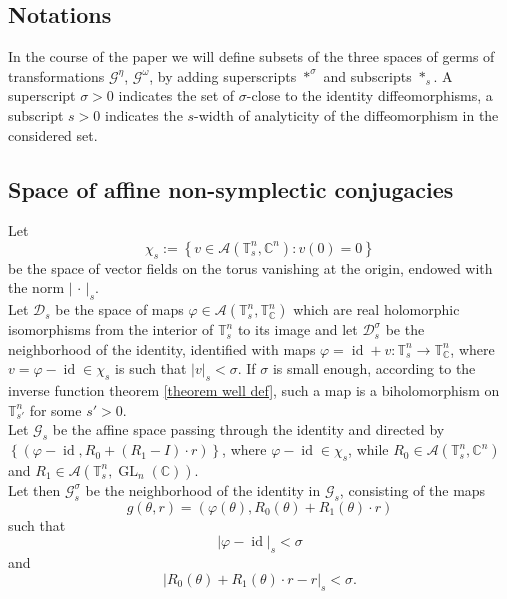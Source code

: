 \documentclass[oneside, 11pt]{amsbook}
\newcommand{\comment}[1]{}
\newcommand{\set}[1]{{\left\{#1\right\}}}
\newcommand{\pa}[1]{{\left(#1\right)}}
\newcommand{\abs}[1]{{\left|#1\right|}}
\newcommand{\G}{\mathcal{G}}
\newcommand{\A}{\mathcal{A}}
\newcommand{\T}{\mathbb{T}}
\newcommand{\C}{\mathbb{C}}
\newcommand{\teta}{\theta}
\newcommand{\GL}{\operatorname{GL}}
\newcommand{\pull}[1]{#1^\ast} %
\newcommand{\id}{\operatorname{id}}
\renewcommand{\S}{{\mathbb S}}
\newcommand{\0}{{(0)}}
\newcommand{\3}{{(3)}}
\numberwithin{equation}{section}
\numberwithin{defn}{section}
\numberwithin{prop}{section}
\numberwithin{cor}{section}
\numberwithin{lemma}{section}
\numberwithin{rmk}{section}
\numberwithin{corollary}{section}
\begin{document}
\subsection*{Notations} In the course of the paper we will define subsets of the three spaces of germs of transformations $\G^\eta$, $\G^{\omega}$, by adding superscripts $\ast^\sigma$ and subscripts $\ast_s$. A superscript $\sigma>0$ indicates the set of $\sigma$-close to the identity diffeomorphisms, a subscript  $s>0$  indicates the $s$-width of analyticity of the diffeomorphism in the considered set.

\subsection{Space of affine non-symplectic conjugacies} 
\label{section conjugacies}
Let $$\chi_s :=\set{v\in\A(\T^n_s,\C^n): v(0)=0}$$ be the space of vector fields on the torus vanishing at the origin, endowed with the norm $\abs{\,\cdot\,}_s$. \\
Let $\mathcal{D}_s$ be the space of maps $\varphi\in\mathcal{A}(\T^n_s,\T^n_\C)$ which are real holomorphic isomorphisms from the interior of $\T^n_s$ to its image and let $\mathcal{D}^\sigma_s$ be the neighborhood of the identity, identified with maps $\varphi = \id + v:\T^n_s\to \T^n_\C$, where $v= \varphi - \id \in\chi_s$ is such that $\abs{v}_s < \sigma.$ If $\sigma$ is small enough, according to the inverse function theorem \ref{theorem well def}, such a map is a biholomorphism on $\T^n_{s'}$ for some $s'>0$.\smallskip\\
\comment{
	Let $\mathcal{D}^\sigma_s$ be the space of holomorphic invertible maps  $\varphi: \T^n_s\to\T^n_\C$, such that $\varphi(0)=0$ and \[\abs{\varphi - \id}_s<\sigma,\] where $\varphi - \id$ is viewed as a map from $\T^n_s$ to $\C^n$.\\ }
\noindent Let $\G_s$ be the affine space passing through the identity and directed by $\set{\pa{\varphi - \id, R_0 + (R_1 - {I})\cdot r}}$, where $\varphi - \id\in\chi_s$, while 
$R_0 \in \mathcal{A}(\T^n_s,\C^n)$ and  $R_1\in\mathcal{A}(\T^n_s,\GL_n(\C))$. %
\comment{\footnote{This normalization, which will guaranty the uniqueness of the transformation, differs from the one chosen by Moser, who solves $u = \pull{g}(v - \lambda)$ instead. See \cite[\S 4-5]{Moser:1967}} }\\
\noindent Let then $\G^\sigma_s$ be the neighborhood of the identity in $\G_s$, consisting of the maps $$g (\teta, r) = \pa{\varphi(\teta), R_0(\teta) + R_1(\teta)\cdot r}$$ such that \[\abs{\varphi - \id}_s < \sigma\] and \[\abs{R_0(\teta) + R_1(\teta)\cdot r - r}_s < \sigma.\]
\end{document}
